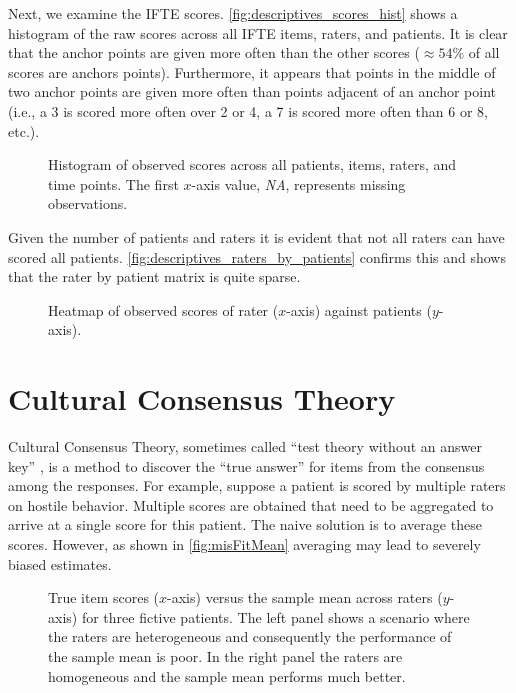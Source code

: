 \documentclass[a4paper,11pt]{article}
\begin{document}
Next, we examine the IFTE scores. 
\autoref{fig:descriptives_scores_hist} shows a histogram of the raw scores across all IFTE items, raters, and patients.
It is clear that the anchor points are given more often than the other scores ($\approx54\%$ of all scores are anchors points).
Furthermore, it appears that points in the middle of two anchor points are given more often than points adjacent of an anchor point (i.e., a 3 is scored more often over 2 or 4, a 7 is scored more often than 6 or 8, etc.).
\begin{figure}[!ht]
	\centering
	
	\caption{Histogram of observed scores across all patients, items, raters, and time points. The first $x$-axis value, \emph{NA}, represents missing observations.}
	\label{fig:descriptives_scores_hist}
\end{figure}
Given the number of patients and raters it is evident that not all raters can have scored all patients.
\autoref{fig:descriptives_raters_by_patients} confirms this and shows that the rater by patient matrix is quite sparse.
\begin{figure}[!ht]
	\centering
	
	\caption{Heatmap of observed scores of rater ($x$-axis) against patients ($y$-axis).}
	\label{fig:descriptives_raters_by_patients}
\end{figure}



\section{Cultural Consensus Theory}

Cultural Consensus Theory, sometimes called ``test theory without an answer key'' \parencite{batchelder1988test}, is a method to discover the ``true answer'' for items from the consensus among the responses.
For example, suppose a patient is scored by multiple raters on hostile behavior.
Multiple scores are obtained that need to be aggregated to arrive at a single score for this patient.
The naive solution is to average these scores.
However, as shown in \autoref{fig:misFitMean} averaging may lead to severely biased estimates.
\begin{figure}[!ht]
	\centering
	
	\caption{True item scores ($x$-axis) versus the sample mean across raters ($y$-axis) for three fictive patients. The left panel shows a scenario where the raters are heterogeneous and consequently the performance of the sample mean is poor. In the right panel the raters are homogeneous and the sample mean performs much better.}
	\label{fig:misFitMean}
\end{figure}
\end{document}
